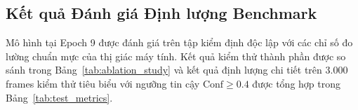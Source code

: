 \documentclass[11pt,a4paper]{article}
\begin{document}
\subsection{Kết quả Đánh giá Định lượng Benchmark}
Mô hình tại Epoch 9 được đánh giá trên tập kiểm định độc lập với các chỉ số đo lường chuẩn mực của thị giác máy tính. Kết quả kiểm thử thành phần được so sánh trong Bảng~\ref{tab:ablation_study} và kết quả định lượng chi tiết trên 3.000 frames kiểm thử tiêu biểu với ngưỡng tin cậy $\text{Conf} \ge 0.4$ được tổng hợp trong Bảng~\ref{tab:test_metrics}.

\begin{table}[H]
\centering
\caption{Bảng đánh giá đóng góp của từng thành phần cải tiến trên tập kiểm định Anti-UAV.}
\label{tab:ablation_study}
\end{table}
\end{document}
